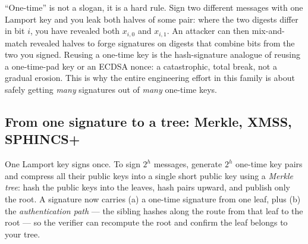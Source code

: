 \begin{trapbox}
``One-time'' is not a slogan, it is a hard rule. Sign two different messages with one Lamport key and you leak both halves of some pair: where the two digests differ in bit $i$, you have revealed both $x_{i,0}$ and $x_{i,1}$. An attacker can then mix-and-match revealed halves to forge signatures on digests that combine bits from the two you signed. Reusing a one-time key is the hash-signature analogue of reusing a one-time-pad key or an ECDSA nonce: a catastrophic, total break, not a gradual erosion. This is why the entire engineering effort in this family is about safely getting \emph{many} signatures out of \emph{many} one-time keys.
\end{trapbox}

\subsection{From one signature to a tree: Merkle, XMSS, SPHINCS+}
\label{ch35:merkle-sphincs}

One Lamport key signs once. To sign $2^h$ messages, generate $2^h$ one-time key pairs and compress all their public keys into a single short public key using a \emph{Merkle tree}: hash the public keys into the leaves, hash pairs upward, and publish only the root. A signature now carries (a) a one-time signature from one leaf, plus (b) the \emph{authentication path} --- the sibling hashes along the route from that leaf to the root --- so the verifier can recompute the root and confirm the leaf belongs to your tree.

